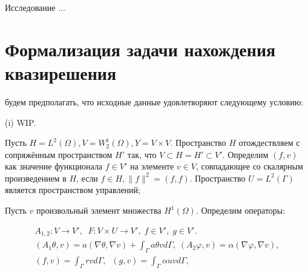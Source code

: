 \documentclass[10pt]{article}
\begin{document}
    Исследование ...

    \section{Формализация задачи нахождения квазирешения}\label{sec:formalization}
    будем предполагать, что исходные данные удовлетворяют следующему условию:

    (i) WIP\@.

    Пусть $H = L^2(\Omega), V = W^1_2(\Omega), Y = V \times V $.
    Пространство $H$ отождествляем с сопряжённым пространством $H'$ так,
    что $V \subset H = H' \subset V'$.
    Определим $(f,v)$ как значение функционала $f \in V'$ на элементе $v \in V$,
    совпадающее со скалярным произведением в $H$, если $f\in H, \|f\|^2 = (f,f)$.
    Пространство $U = L^2(\Gamma)$ является пространством управлений;


    Пусть $v$ произвольный элемент множества $H^1(\Omega)$.
    Определим операторы:

    \begin{gather*}
        A_{1,2}\colon V \to V', \;\; F \colon V \times U \to V', \; f \in V', \; g \in V'.\\
        (A_1\theta,v) = a( \nabla \theta, \nabla v ) + \int_\Gamma a \theta v d\Gamma, \;
        (A_2 \varphi, v) = \alpha (\nabla \varphi,\nabla v), \\
        (f,v) = \int_\Gamma r v d\Gamma, \;\; (g,v) = \int_\Gamma \alpha u v d\Gamma,\\
    \end{gather*}
\end{document}
